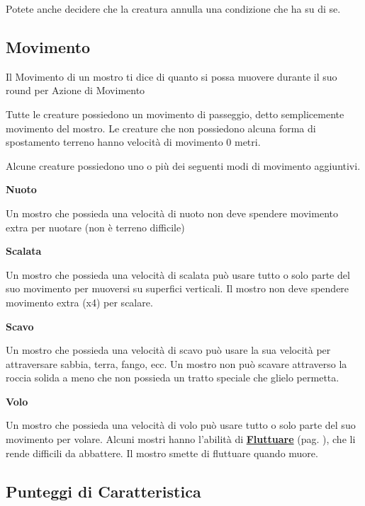 \begin{multicols}{2}
\medskip

Potete anche decidere che la creatura annulla una condizione che ha su di se.

\subsection{Movimento}

Il Movimento di un mostro ti dice di quanto si possa muovere durante il suo round per Azione di Movimento

Tutte le creature possiedono un movimento di passeggio, detto semplicemente movimento del mostro. Le creature che non possiedono alcuna forma di spostamento terreno hanno velocità di movimento 0 metri.

Alcune creature possiedono uno o più dei seguenti modi di movimento aggiuntivi.


\smallskip\textbf{Nuoto}

Un mostro che possieda una velocità di nuoto non deve spendere movimento extra per nuotare (non è terreno difficile)

\smallskip\textbf{Scalata}

Un mostro che possieda una velocità di scalata può usare tutto o solo parte del suo movimento per muoversi su superfici verticali. Il mostro non deve spendere movimento extra (x4) per scalare.

\smallskip\textbf{Scavo}

Un mostro che possieda una velocità di scavo può usare la sua velocità per attraversare sabbia, terra, fango, ecc. Un mostro non può scavare attraverso la roccia solida a meno che non possieda un tratto speciale che glielo permetta.

\smallskip\textbf{Volo}

Un mostro che possieda una velocità di volo può usare tutto o solo parte del suo movimento per volare. Alcuni mostri hanno l'abilità di \hyperlink{Fluttuare}{\textbf{Fluttuare}} (pag. \pageref{Fluttuare}), che li rende difficili da abbattere. Il mostro smette di fluttuare quando muore.

\subsection{Punteggi di Caratteristica}


\end{multicols}

